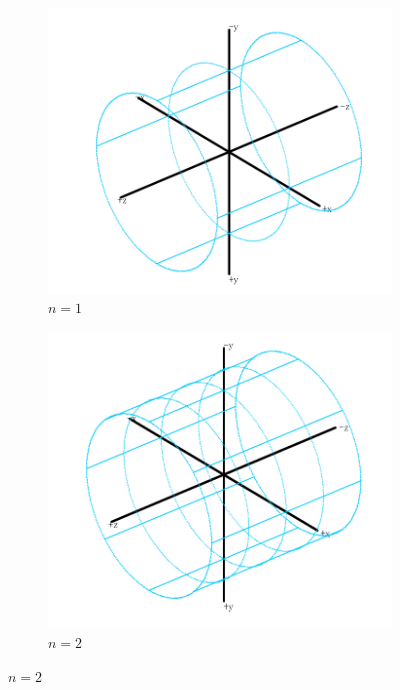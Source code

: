 \documentclass{gshs_thesis}
\theoremstyle{theorem}
\theoremstyle{lemma}
\theoremstyle{definition}
\begin{document}
\begin{figure}[h]
	\begin{center}
		\begin{subfigure}{.3\textwidth}
			\includegraphics[width=\textwidth]{image/subdivision1}
			\caption{$n=1$}
		\end{subfigure}
		\begin{subfigure}{.3\textwidth}
			\includegraphics[width=\textwidth]{image/subdivision2}
			\caption{$n=2$}
		\end{subfigure}

\end{center}
\end{figure}
\end{document}
